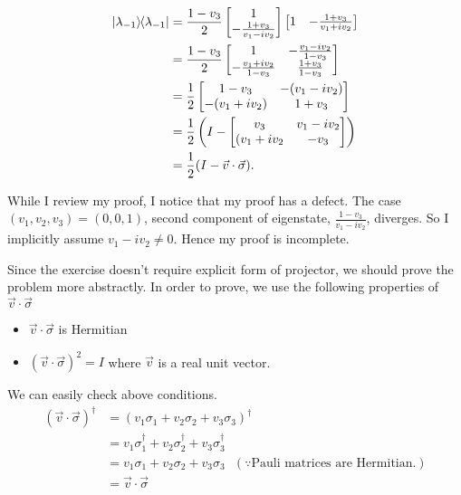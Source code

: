 \begin{align*}
	\ket{\lambda_{-1}}\hspace{-1mm} \bra{\lambda_{-1}} &= \frac{1 - v_3}{2} \begin{bmatrix}
	1 \\
	- \frac{1+v_3}{v_1 - iv_2}
	\end{bmatrix}
	\begin{bmatrix}
		1 & - \frac{1+v_3}{v_1 + iv_2}
	\end{bmatrix}\\
	&=
	\frac{1 - v_3}{2} \begin{bmatrix}
		1 & - \frac{v_1 - iv_2}{1 - v_3} \\
		- \frac{v_1 + iv_2}{1 - v_3} & \frac{1+v_3}{1 - v_3}
	\end{bmatrix} \\
	&=
	\frac{1}{2} \begin{bmatrix}
		1 - v_3 & -(v_1 - iv_2) \\
		- (v_1 + iv_2) & 1 + v_3
	\end{bmatrix} \\
	&=
	\frac{1}{2} \left( I - \begin{bmatrix}
		v_3 & v_1 - iv_2 \\
		(v_1 + iv_2 & - v_3
	\end{bmatrix} \right)\\
	&= \frac{1}{2} (I - \vec{v} \cdot \vec{\sigma} ).
\end{align*}


	While I review my proof, I notice that my proof has a defect.
	The case $(v_1,v_2,v_3) = (0,0,1)$, second component of eigenstate, $\frac{1-v_3}{v_1 - iv_2}$, diverges.
	So I implicitly assume $v_1 - iv_2 \neq 0$. Hence my proof is incomplete.

	Since the exercise doesn't require explicit form of projector, we should prove the problem more abstractly.
	In order to prove, we use the following properties of $\vec{v} \cdot \vec{\sigma}$
	\begin{itemize}
		\item $\vec{v} \cdot \vec{\sigma}$ is Hermitian
		\item $(\vec{v} \cdot \vec{\sigma})^2 = I$ where $\vec{v}$ is a real unit vector.
	\end{itemize}

	We can easily check above conditions.
	\begin{align*}
	(\vec{v} \cdot \vec{\sigma})^\dagger &= (v_1 \sigma_1 + v_2 \sigma_2 + v_3 \sigma_3)^\dagger\\
	&= v_1 \sigma_1^\dagger + v_2 \sigma_2^\dagger + v_3 \sigma_3^\dagger\\
	&= v_1 \sigma_1 + v_2 \sigma_2 + v_3 \sigma_3~~~(\because \text{Pauli matrices are Hermitian.})\\
	&= \vec{v} \cdot \vec{\sigma}
	\end{align*}

